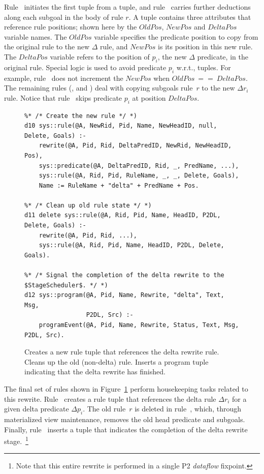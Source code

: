 Rule~ initiates the first  tuple from a 
tuple, and rule~ carries further  deductions along each
subgoal in the body of rule $r$.  A  tuple contains three
attributes that reference rule positions; shown here by the $OldPos$, $NewPos$
and $DeltaPos$ variable names.  The $OldPos$ variable specifies the predicate
position to copy from the original rule to the new $\Delta$ rule, and $NewPos$
is its position in this new rule.  The $DeltaPos$ variable refers to the
position of $p_i$, the new $\Delta$ predicate, in the original rule.  Special
logic is used to avoid predicate $p_i$ w.r.t.,  tuples.  For
example, rule~ does not increment the $NewPos$ when $OldPos\ ==\
DeltaPos$.  The remaining rules (,  and ) deal with
copying subgoals rule~$r$ to the new $\Delta r_i$ rule.  Notice that rule~
skips predicate $p_i$ at position $DeltaPos$.

\begin{figure}
\ssp
\centering
\begin{lstlisting}
%* /* Create the new rule */ *)
d10 sys::rule(@A, NewRid, Pid, Name, NewHeadID, null, Delete, Goals) :-
    rewrite(@A, Pid, Rid, DeltaPredID, NewRid, NewHeadID, Pos),
    sys::predicate(@A, DeltaPredID, Rid, _, PredName, ...),
    sys::rule(@A, Rid, Pid, RuleName, _, _, Delete, Goals),
    Name := RuleName + "delta" + PredName + Pos.

%* /* Clean up old rule state */ *)
d11 delete sys::rule(@A, Rid, Pid, Name, HeadID, P2DL, Delete, Goals) :-
    rewrite(@A, Pid, Rid, ...),
    sys::rule(@A, Rid, Pid, Name, HeadID, P2DL, Delete, Goals).
  
%* /* Signal the completion of the delta rewrite to the $StageScheduler$. */ *)
d12 sys::program(@A, Pid, Name, Rewrite, "delta", Text, Msg, 
                 P2DL, Src) :-
    programEvent(@A, Pid, Name, Rewrite, Status, Text, Msg, P2DL, Src).
\end{lstlisting}
\caption{\label{ch:evita:fig:delta4}Creates a new rule tuple that references the delta 
rewrite rule. Cleans up the old (non-delta) rule. Inserts a program tuple indicating
that the delta rewrite has finished. }
\end{figure}

The final set of rules shown in Figure~\ref{ch:evita:fig:delta4} perform
housekeeping tasks related to this rewrite.  Rule~\ol{d10} creates a rule tuple
that references the delta rule $\Delta r_i$ for a given delta predicate $\Delta
p_i$.  The old rule~$r$ is deleted in rule~\ol{d11}, which, through
materialized view maintenance, removes the old head predicate and subgoals.
Finally, rule~\ol{d12} inserts a \ol{program} tuple that indicates the
completion of the delta rewrite stage.~\footnote{Note that this entire rewrite
is performed in a single P2 {\em dataflow} fixpoint.}

